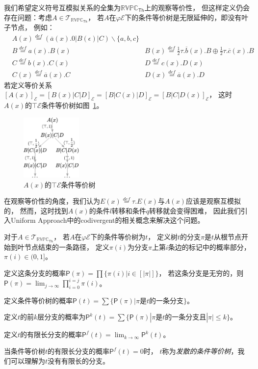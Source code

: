 我们希望定义符号互模拟关系的全集为$\mathbb{RVPC}_{\mathsf{Th}}$上的观察等价性，
但这样定义仍会存在问题：考虑$A\in\mathcal{T}_{\mathbb{RVPC}_{\mathsf{Th}}}$，
若$A$在$\varphi\mathcal{E}$下的条件等价树是无限延伸的，即没有叶子节点，
例如：
\begin{align*}
   &A(x) \stackrel{def}{=} (\overline{a}(x).0|B(\epsilon)|C)\backslash \{a,b,c\} &\\
   &B\stackrel{def}{=}a(x).B(x)
   &B(x)\stackrel{def}{=} \frac{1}{2}\tau.\overline{b}(x).B\oplus \frac{1}{2}\tau.\overline{c}(x).B\\
   &C\stackrel{def}{=} b(x).C(x)
   &D\stackrel{def}{=} c(x).D(x)\\
   &C(x)\stackrel{def}{=} \overline{a}(x).C
   &D(x)\stackrel{def}{=} \overline{a}(x).D
\end{align*}
若定义等价关系$[A(x)]_{\mathcal{E}}=[B(x)|C|D]_{\mathcal{E}}=[B|C(x)|D]_{\mathcal{E}}=[B|C|D(x)]_{\mathcal{E}}$，
这时$A(x)$的$\top \mathcal{E}$条件等价树如图~\ref{fig:divergent}。
\begin{figure}[!htbp]
   \small
   \centering
   \includegraphics[width=3cm]{../figures/codivergent.png}
   \caption[]{$A(x)$的$\top \mathcal{E}$条件等价树} 
   \label{fig:divergent}
\end{figure}
在观察等价性的角度，我们认为$E(x)\stackrel{def}{=}\tau.E(x)$与$A(x)$应该是观察互模拟的，
然而，这时找到$A(x)$的条件$l$转移和条件$q$转移就会变得困难，
因此我们引入Uniform Approach中的codivergent的相关概念来解决这个问题。

\begin{definition}\label{def:divergent}
   对于$A\in\mathcal{T}_{\mathbb{RVPC}_{\mathsf{Th}}}$，
   若$A$在$\varphi\mathcal{E}$下的条件等价树为$t$，
   定义树$t$的分支$\pi$是$t$从根节点开始到叶节点结束的一条路径，
   定义$\pi(i)$为分支$\pi$上第$i$条边的标记中的概率部分，$\pi(i)\in(0,1]$。

   定义这条分支的概率$\mathsf{P}(\pi)=\prod\{\pi(i)|i\in [|\pi|]\}$，
   若这条分支是无穷的，则$\mathsf{P}(\pi)=\lim_{j\rightarrow \infty}\prod_{i=0}^{i=j}\pi(i)$。

   定义条件等价树的概率$\mathsf{P}(t)=\sum\{\mathsf{P}(\pi)|\pi\textrm{是}t\textrm{的一条分支}\}$。
   
   定义$t$的前$k$层分支的概率为$\mathsf{P}^k(t)=\sum \{\mathsf{P}(\pi)|\pi\textrm{是}t\textrm{的一条分支且}|\pi|\leq k\}$。

   定义$t$的有限长分支的概率$\mathsf{P}^f(t)=\lim_{k\rightarrow\infty}\mathsf{P}^k(t)$。

   当条件等价树$t$的有限长分支的概率$\mathsf{P}^f(t)=0$时，
   $t$称为\textit{发散的条件等价树}，我们可以理解为$t$没有有限长的分支。
\end{definition}

